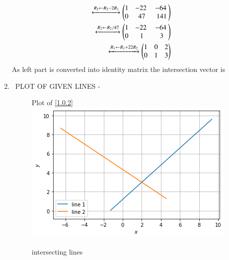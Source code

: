 \documentclass[journal,12pt,twocolumn]{IEEEtran}
\begin{document}
\begin{enumerate}
\begin{align}
\xleftrightarrow {R_2\leftarrow R_2-2R_1}\myvec{1 & -22 & -64 \\0 & 47& 141}
\\
\xleftrightarrow {R_2\leftarrow R_2/47}\myvec{1 & -22 & -64 \\0 & 1 & 3}
\\
\xleftrightarrow {R_1 \leftarrow R_1+22R_2}\myvec {1 & 0 & 2\\0 & 1 & 3}
\end{align}
%
As left part is converted into identity matrix the intersection vector is 
\item   PLOT OF GIVEN LINES -
\begin{figure}[!ht]
Plot of \eqref{1.0.2} 
    \centering
   \includegraphics[width=\columnwidth]{figure2(2).png}
    \caption{intersecting lines}
    \label{fig: intersecting lines.}
\end{figure}    
\end{enumerate}
\end{document}
